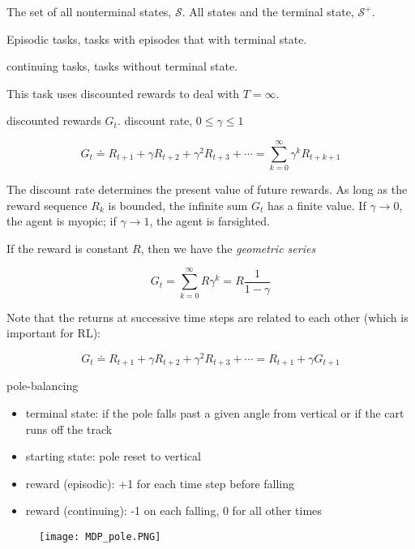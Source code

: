 \documentclass[sutton_barto_notes.tex]{subfiles}
\begin{document}
The set of all nonterminal states, $\mathcal{S}$. All states and the terminal state, $\mathcal{S^+}$.

\begin{definition}
Episodic tasks, tasks with episodes that with terminal state.
\end{definition}

\begin{definition}
continuing tasks, tasks without terminal state.
\end{definition}

This task uses discounted rewards to deal with $T=\infty$.

\begin{definition}
discounted rewards $G_t$. discount rate, $0 \leq \gamma \leq 1$

$$ G_t \doteq R_{t+1} + \gamma R_{t+2} + \gamma^2 R_{t+3} + \cdots = \sum_{k=0}^{\infty} \gamma^k R_{t+k+1} $$
\end{definition}

The discount rate determines the present value of future rewards. As long as the reward sequence {$R_k$} is bounded, the infinite sum $G_t$ has a finite value.
If $\gamma \rightarrow 0$, the agent is myopic; if $\gamma \rightarrow 1$, the agent is farsighted.

If the reward is constant $R$, then we have the \textit{geometric series}

$$ G_t = \sum_{k=0}^{\infty} R\gamma^k = R\frac{1}{1-\gamma} $$

Note that the returns at successive time steps are related to each other (which is important for RL):

$$ G_t \doteq R_{t+1} + \gamma R_{t+2} + \gamma^2 R_{t+3} + \cdots = R_{t+1} + \gamma G_{t+1} $$

\begin{example} pole-balancing
\begin{itemize}
\item terminal state: if the pole falls past a given angle from vertical or if the cart runs off the track
\item starting state: pole reset to vertical
\item reward (episodic): +1 for each time step before falling
\item reward (continuing): -1 on each falling, 0 for all other times
\end{itemize}
\end{example}


\begin{figure}[!h]
  \texttt{[image: MDP\_pole.PNG]}
  \label{fig:MDP_pole}
\end{figure}
\end{document}
